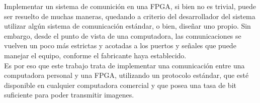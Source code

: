 Implementar un sistema de comunición en una FPGA, si bien no es trivial, puede ser resuelto de muchas maneras, quedando a criterio del desarrollador del sistema utilizar algún sistema de comunicación estándar, o bien, diseñar uno propio. Sin embargo, desde el punto de vista de una computadora, las comunicaciones se vuelven un poco más estrictas y acotadas a los puertos y señales que puede manejar el equipo, conforme el fabricante haya establecido.\\

Es por eso que este trabajo trata de implementar una comunicación entre una computadora personal y una FPGA, utilizando un protocolo estándar, que esté disponible en cualquier computadora comercial y que posea una tasa de bit suficiente para poder transmitir imagenes.\\



%
%
%
%
%
%
%
%
%




